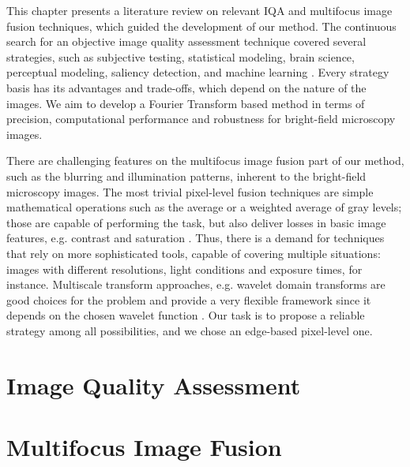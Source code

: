 This chapter presents a literature review on relevant IQA and multifocus image fusion techniques, which guided the development of our method. The continuous search for an objective image quality assessment technique covered several strategies, such as subjective testing, statistical modeling, brain science, perceptual modeling, saliency detection, and machine learning \cite{tang2019feature}. Every strategy basis has its advantages and trade-offs, which depend on the nature of the images. We aim to develop a Fourier Transform based method in terms of precision, computational performance and robustness for bright-field microscopy images.

There are challenging features on the multifocus image fusion part of our method, such as the blurring and illumination patterns, inherent to the bright-field microscopy images. The most trivial pixel-level fusion techniques are simple mathematical operations such as the average or a weighted average of gray levels; those are capable of performing the task, but also deliver losses in basic image features, e.g. contrast and saturation \cite{zhang2009multifocus}. Thus, there is a demand for techniques that rely on more sophisticated tools, capable of covering multiple situations: images with different resolutions, light conditions and exposure times, for instance. Multiscale transform approaches, e.g. wavelet domain transforms are good choices for the problem and provide a very flexible framework since it depends on the chosen wavelet function \cite{pajares2004wavelet}. Our task is to propose a reliable strategy among all possibilities, and we chose an edge-based pixel-level one.  

\section{Image Quality Assessment}


\section{Multifocus Image Fusion}
